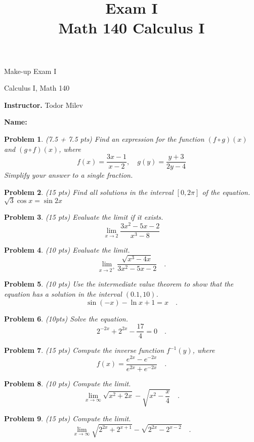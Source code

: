 \documentclass{article}
\date{}
\title{Exam I\\ Math 140 Calculus I }
\newtheorem{problem}{Problem}
\begin{document}
\begin{center}
\LARGE
Make-up Exam I 

Calculus I, Math 140
\end{center}
\textbf{Instructor. } Todor Milev

\noindent \textbf{Name:}
\medskip

\begin{problem}
(7.5 + 7.5 pts) Find an expression for the function $(f\circ g)(x)$ and $(g\circ f)(x)$, where 
\[
f(x)= \frac{3x-1}{x-2},\quad  g(y)=\frac{y+3 }{2y-4} 
\] Simplify your answer to a single fraction.
\end{problem}

\vskip 9cm

\begin{problem} (15 pts)
Find all solutions in the interval $[0,2\pi]$ of the equation.
$\sqrt{ 3}\cos x=  \sin 2x$
\end{problem}

\newpage
\begin{problem} (15 pts) Evaluate the limit if it exists.
\[\lim\limits_{x\to 2} \frac{3x^2-5x-2}{x^3-8}
\]
\end{problem}

\vskip 9cm

\begin{problem} (10 pts)
Evaluate the limit.
\[\lim\limits_{x\to 2^+} \frac{\sqrt{x^3-4x }}{3x^2 -5x-2 }\quad .
\]
\end{problem}

\newpage
\begin{problem} (10 pts)
Use the intermediate value theorem to show that the equation has a solution in the interval $(0.1,10)$.
\[\sin  (-x)-\ln x+1 =x \quad .
\]
\end{problem}
\vskip 9cm
\begin{problem} (10pts)
Solve the equation.
\[2^{-2x}+2^{2x}- \frac{17}{4}=0\quad .
\]
\end{problem}
\newpage
\begin{problem} (15 pts)
Compute the inverse function $f^{-1}(y) $, where
\[
f(x)=\frac{e^{2x}-e^{-2x}}{e^{2x}+e^{-2x}}\quad .
\] 
\end{problem}
\vskip 9cm
\begin{problem} (10 pts)
Compute the limit.
\[\lim\limits_{x\to\infty}\sqrt{x^2+2x}-\sqrt{x^2-\frac{x}4}\quad .
\]
\end{problem}
\newpage 
{}
\begin{problem} (15 pts)
Compute the limit.
\[
\lim_{x\to \infty} \sqrt{ 2^{2x}+2^{x+1}}-\sqrt{2^{2x}-2^{x-2}}\quad .
\]

\end{problem}
\end{document}
